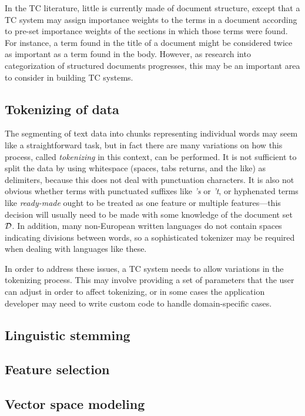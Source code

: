 In the TC literature, little is currently made of document structure,
except that a TC system may assign importance weights to the terms in
a document according to pre-set importance weights of the sections in
which those terms were found.  For instance, a term found in the title
of a document might be considered twice as important as a term found
in the body.  However, as research into categorization of structured
documents progresses, this may be an important area to consider in
building TC systems.

\subsection{Tokenizing of data}

The segmenting of text data into chunks representing individual words
may seem like a straightforward task, but in fact there are many
variations on how this process, called \emph{tokenizing} in this
context, can be performed.\cite[p. XXX]{manning:99} It is not
sufficient to split the data by using whitespace (spaces, tabs
returns, and the like) as delimiters, because this does not deal with
punctuation characters.  It is also not obvious whether terms with
punctuated suffixes like \emph{'s} or \emph{'t}, or hyphenated terms
like \emph{ready-made} ought to be treated as one feature or multiple
features---this decision will usually need to be made with some
knowledge of the document set $\mathcal{D}$.  In addition, many non-European
written languages do not contain spaces indicating divisions between
words, so a sophisticated tokenizer may be required when dealing with
languages like these.

In order to address these issues, a TC system needs to allow
variations in the tokenizing process.  This may involve providing a
set of parameters that the user can adjust in order to affect
tokenizing, or in some cases the application developer may need to
write custom code to handle domain-specific cases.

\subsection{Linguistic stemming}



\subsection{Feature selection}

\subsection{Vector space modeling}

